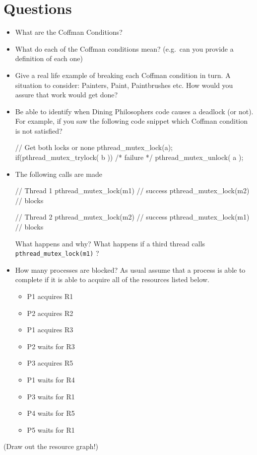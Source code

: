 \section{Questions}

\begin{itemize}
\item
  What are the Coffman Conditions?
\item
  What do each of the Coffman conditions mean? (e.g.~can you provide a definition of each one)
\item
  Give a real life example of breaking each Coffman condition in turn. A situation to consider: Painters, Paint, Paintbrushes etc. How would you assure that work would get done?
\item
  Be able to identify when Dining Philosophers code causes a deadlock (or not). For example, if you saw the following code snippet which Coffman condition is not satisfied?

\begin{code}[language=C]
// Get both locks or none
pthread_mutex_lock(a);
if(pthread_mutex_trylock( b )) { /* failure */
  pthread_mutex_unlock( a );
}
\end{code}
\item
  The following calls are made

\begin{code}[language=c]
// Thread 1
pthread_mutex_lock(m1) // success
pthread_mutex_lock(m2) // blocks

// Thread 2
pthread_mutex_lock(m2) // success
pthread_mutex_lock(m1) // blocks
\end{code}

  What happens and why? What happens if a third thread calls
  \texttt{pthread\_mutex\_lock(m1)} ?
\item
  How many processes are blocked? As usual assume that a process is able
  to complete if it is able to acquire all of the resources listed
  below.

  \begin{itemize}
  \tightlist
  \item
    P1 acquires R1
  \item
    P2 acquires R2
  \item
    P1 acquires R3
  \item
    P2 waits for R3
  \item
    P3 acquires R5
  \item
    P1 waits for R4
  \item
    P3 waits for R1
  \item
    P4 waits for R5
  \item
    P5 waits for R1
  \end{itemize}
\end{itemize}

(Draw out the resource graph!)


